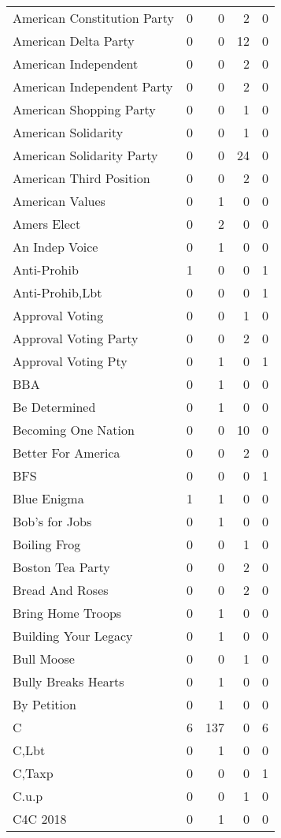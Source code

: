 \begin{supertabular}{lrrrr}
American Constitution Party & 0 & 0 & 2 & 0\\
American Delta Party & 0 & 0 & 12 & 0\\
American Independent & 0 & 0 & 2 & 0\\
American Independent Party & 0 & 0 & 2 & 0\\
American Shopping Party & 0 & 0 & 1 & 0\\
American Solidarity & 0 & 0 & 1 & 0\\
American Solidarity Party & 0 & 0 & 24 & 0\\
American Third Position & 0 & 0 & 2 & 0\\
American Values & 0 & 1 & 0 & 0\\
Amers Elect & 0 & 2 & 0 & 0\\
An Indep Voice & 0 & 1 & 0 & 0\\
Anti-Prohib & 1 & 0 & 0 & 1\\
Anti-Prohib,Lbt & 0 & 0 & 0 & 1\\
Approval Voting & 0 & 0 & 1 & 0\\
Approval Voting Party & 0 & 0 & 2 & 0\\
Approval Voting Pty & 0 & 1 & 0 & 1\\
BBA & 0 & 1 & 0 & 0\\
Be Determined & 0 & 1 & 0 & 0\\
Becoming One Nation & 0 & 0 & 10 & 0\\
Better For America & 0 & 0 & 2 & 0\\
BFS & 0 & 0 & 0 & 1\\
Blue Enigma & 1 & 1 & 0 & 0\\
Bob's for Jobs & 0 & 1 & 0 & 0\\
Boiling Frog & 0 & 0 & 1 & 0\\
Boston Tea Party & 0 & 0 & 2 & 0\\
Bread And Roses & 0 & 0 & 2 & 0\\
Bring Home Troops & 0 & 1 & 0 & 0\\
Building Your Legacy & 0 & 1 & 0 & 0\\
Bull Moose & 0 & 0 & 1 & 0\\
Bully Breaks Hearts & 0 & 1 & 0 & 0\\
By Petition & 0 & 1 & 0 & 0\\
C & 6 & 137 & 0 & 6\\
C,Lbt & 0 & 1 & 0 & 0\\
C,Taxp & 0 & 0 & 0 & 1\\
C.u.p & 0 & 0 & 1 & 0\\
C4C 2018 & 0 & 1 & 0 & 0\\

\end{supertabular}
